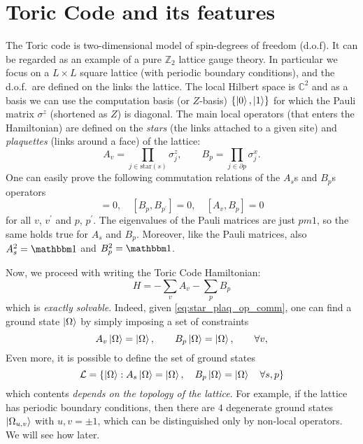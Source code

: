 \section{Toric Code and its features}
\label{sec:toric_code_and_its_features}

The Toric code is two-dimensional model of spin-\onehalf degrees of freedom (d.o.f).
It can be regarded as an example of a pure $\mathbb{Z}_2$ lattice gauge theory.
In particular we focus on a $L \times L$ square lattice (with periodic boundary conditions), and the d.o.f.~are defined on the links the lattice.
The local Hilbert space is $\mathbb{C}^2$ and as a basis we can use the computation basis (or $Z$-basis) $\qty{ \ket{0}, \ket{1} }$ for which the Pauli matrix $\sigma^z$ (shortened as $Z$) is diagonal.
The main local operators (that enters the Hamiltonian) are defined on the \emph{stars} (the links attached to a given site) and \emph{plaquettes} (links around a face) of the lattice:
\begin{equation}
    A_v = \prod_{j \in \text{star}(s)} \sigma^z_j, \qquad
    B_p = \prod_{j \in \partial p} \sigma^x_j.
\end{equation}
One can easily prove the following commutation relations of the $A_s$s and $B_p$s operators
\begin{equation}
    [ A_v, A_{v^{\prime} } ] = 0, \quad
    [ B_p, B_{p^{\prime} } ] = 0, \quad
    [ A_v, B_p ] = 0
    \label{eq:star_plaq_op_comm}
\end{equation}
for all $v$, $v^{\prime} $ and $p$, $p^{\prime} $.
The eigenvalues of the Pauli matrices are just $pm 1$, so the same holds true for $A_s$ and $B_p$.
Moreover, like the Pauli matrices, also $A_s^2 = \One$ and $B_p^2 = \One$.


Now, we proceed with writing the Toric Code Hamiltonian:
\begin{equation}
    H = - \sum_{v} A_v - \sum_{p} B_p
    \label{eq:toric_code_hamiltonian}
\end{equation}
which is \emph{exactly solvable}.
Indeed, given \eqref{eq:star_plaq_op_comm}, one can find a ground state $\ket{\Omega}$  by simply imposing a set of constraints
\begin{equation}
    A_v \ket{\Omega} = \ket{\Omega}, \qquad
    B_p \ket{\Omega} = \ket{\Omega}, \qquad \forall v,
    \label{eq:ground_state_constraints}
\end{equation}
Even more, it is possible to define the set of ground states
\begin{equation}
    \mathcal{L} = \qty{ \ket{\Omega} : A_s \ket{\Omega} = \ket{\Omega}, \quad B_p \ket{\Omega} = \ket{\Omega} \quad \forall s, p }
\end{equation}
which contents \emph{depends on the topology of the lattice}.
For example, if the lattice has periodic boundary conditions, then there are $4$ degenerate ground states $\ket{\Omega_{u,v}}$ with $u, v = \pm 1$, which can be distinguished only by non-local operators.
We will see how later.

